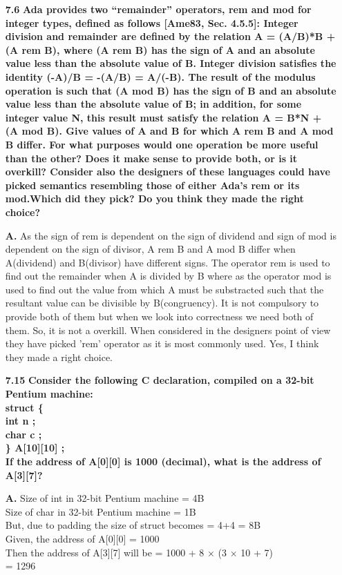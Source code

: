 \documentclass[letterpaper]{article}
\begin{document}
\begin{large}
\begin{flushleft}
\begin{enumerate}
\item[\textbf{7.6}]
\textbf{Ada provides two “remainder” operators, rem and mod for integer types, defined as follows [Ame83, Sec. 4.5.5]: Integer division and remainder are defined by the relation A = (A/B)*B + (A rem B), where (A rem B) has the sign of A and an absolute value less than the absolute value of B. Integer division satisfies the identity (-A)/B = -(A/B) = A/(-B). The result of the modulus operation is such that (A mod B) has the sign of B and an absolute value less than the absolute value of B; in addition, for some integer value N, this result must satisfy the relation A = B*N + (A mod B). Give values of A and B for which A rem B and A mod B differ. For what purposes would one operation be more useful than the other? Does it make sense to provide both, or is it overkill? Consider also the designers of these languages could have picked semantics resembling those of either Ada’s rem or its mod.Which did they pick? Do you think they made the right choice?}
\item[\textbf{A.}]
As the sign of rem is dependent on the sign of dividend and sign of mod is dependent on the sign of divisor, A rem B and A mod B differ when A(dividend) and B(divisor) have different signs. The operator rem is used to find out the remainder when A is divided by B where as the operator mod is used to find out the value from which A must be substracted such that the resultant value can be divisible by B(congruency). It is not compulsory to provide both of them but when we look into correctness we need both of them. So, it is not a overkill. When considered in the designers point of view they have picked 'rem' operator as it is most commonly used. Yes, I think they made a right choice.\\[0.2in]

\pagebreak
   
\item[\textbf{7.15}]
\textbf{Consider the following C declaration, compiled on a 32-bit Pentium machine:\\
struct \{ \\
int n ;\\
char c ;\\
\} A[10][10] ;\\
If the address of A[0][0] is 1000 (decimal), what is the address of A[3][7]?
}\item[\textbf{A.}]
Size of int in 32-bit Pentium machine = 4B\\
Size of char in 32-bit Pentium machine = 1B\\
But, due to padding the size of struct becomes = 4+4 = 8B\\
Given, the address of A[0][0] = 1000 \\
Then the address of A[3][7] will be = 1000 + 8 $\times$ (3 $\times$ 10 + 7)\\
\qquad\qquad\qquad\qquad\qquad\qquad\qquad\quad = 1296\\[0.2in]


\end{enumerate}
\end{flushleft}
\end{large}
\end{document}
